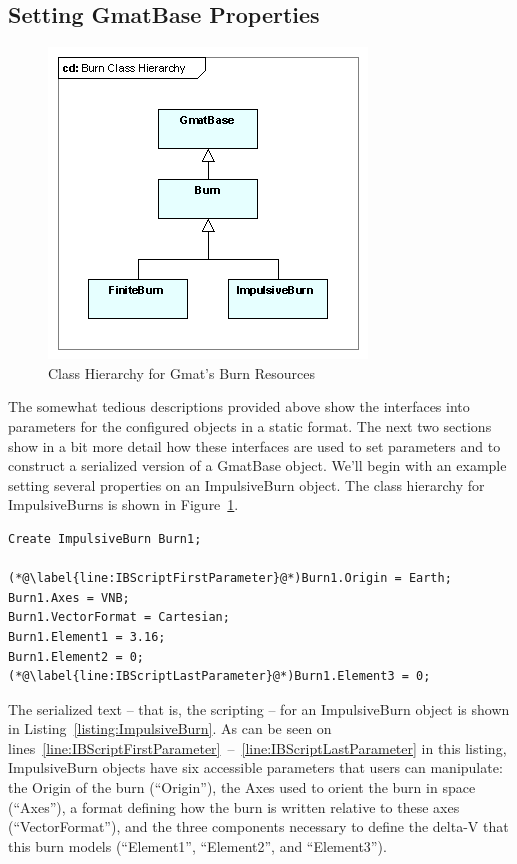 \subsection{Setting GmatBase Properties}

\begin{figure}[htb]
\begin{center}
\includegraphics[160,155]{Images/BurnClassHierarchy.png}
\caption{\label{figure:BurnClassOverview}Class Hierarchy for Gmat's Burn Resources}
\end{center}
\end{figure}

The somewhat tedious descriptions provided above show the interfaces into parameters for the
configured objects in a static format.  The next two sections show in a bit more detail how these
interfaces are used to set parameters and to construct a serialized version of a GmatBase object. 
We'll begin with an example setting several properties on an ImpulsiveBurn object.  The class
hierarchy for ImpulsiveBurns is shown in Figure~\ref{figure:BurnClassOverview}.

\begin{lstlisting}[caption={Script Listing for an ImpulsiveBurn},
label={listing:ImpulsiveBurn}]
Create ImpulsiveBurn Burn1;

(*@\label{line:IBScriptFirstParameter}@*)Burn1.Origin = Earth;
Burn1.Axes = VNB;
Burn1.VectorFormat = Cartesian;
Burn1.Element1 = 3.16;
Burn1.Element2 = 0;
(*@\label{line:IBScriptLastParameter}@*)Burn1.Element3 = 0;
\end{lstlisting}
\lstset{numbers=none}

The serialized text -- that is, the scripting -- for an ImpulsiveBurn object is shown in
Listing~\ref{listing:ImpulsiveBurn}.  As can be seen on
lines~\ref{line:IBScriptFirstParameter}~--~\ref{line:IBScriptLastParameter} in this listing,
ImpulsiveBurn objects have six accessible parameters that users can manipulate: the Origin of the
burn (``Origin''), the Axes used to orient the burn in space (``Axes''), a format defining how the
burn is written relative to these axes (``VectorFormat''), and the three components necessary to
define the delta-V that this burn models (``Element1'', ``Element2'', and ``Element3'').

